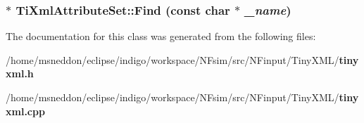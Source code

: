 \subsubsection{$\ast$ TiXmlAttributeSet::Find (const char $\ast$ {\em \_\-name})\hspace{0.3cm}{\tt  [inline]}}\label{classTiXmlAttributeSet_2f210bed54c832adf1683c44c35727b9}




The documentation for this class was generated from the following files:\begin{CompactItemize}
\item 
/home/msneddon/eclipse/indigo/workspace/NFsim/src/NFinput/TinyXML/{\bf tinyxml.h}\item 
/home/msneddon/eclipse/indigo/workspace/NFsim/src/NFinput/TinyXML/{\bf tinyxml.cpp}\end{CompactItemize}
